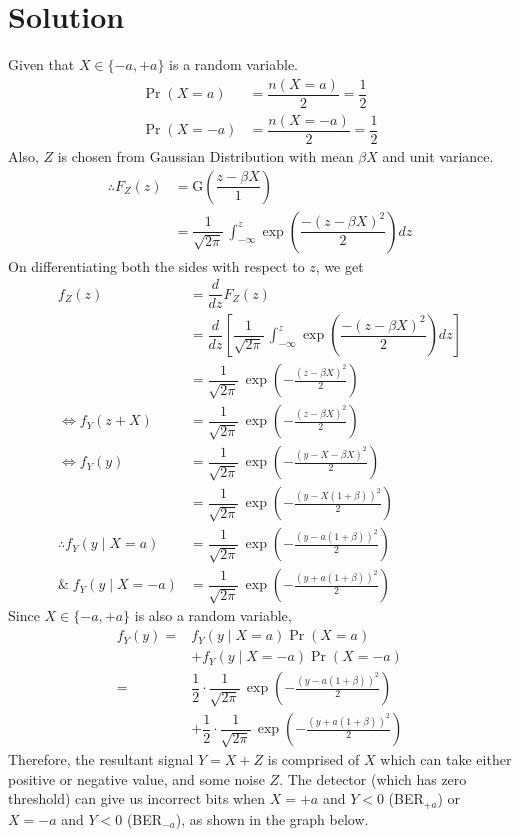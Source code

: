 \documentclass[journal,10pt,twocolumn]{IEEEtran}
\begin{document}
\section{Solution}
Given that $X \in \{ -a, +a\}$ is a random variable.
\begin{align}
\Pr(X=a) &= \dfrac{n(X=a)}{2} = \dfrac{1}{2}\\
\Pr(X=-a) &= \dfrac{n(X=-a)}{2} = \dfrac{1}{2}
\end{align}
Also, $Z$ is chosen from Gaussian Distribution with mean $\beta X$ and unit variance.
\begin{align}
\therefore F_Z(z) &= \text{G} \left( \dfrac{z - \beta X}{1} \right)\\
&= \dfrac{1}{\sqrt{2\pi}}\, \int_{-\infty} ^z \exp \left( \dfrac{-(z-\beta X)^2}{2} \right) dz
\end{align}
On differentiating both the sides with respect to $z$, we get
\begin{align}
f_Z(z) &= \dfrac{d}{dz}F_Z(z) \\
&= \dfrac{d}{dz} \left[ \dfrac{1}{\sqrt{2\pi}}\, \int_{-\infty} ^z \exp \left( \dfrac{-(z-\beta X)^2}{2} \right) dz \right] \\
 &= \dfrac{1}{\sqrt{2\pi}}\,\exp \left(-\frac{(z - \beta X)^2}{2} \right)  \\
\Leftrightarrow f_Y(z + X) &= \dfrac{1}{\sqrt{2\pi}}\,\exp \left(-\frac{(z - \beta X)^2}{2} \right)  \\
\Leftrightarrow f_Y(y) &= \dfrac{1}{\sqrt{2\pi}}\,\exp \left(-\frac{(y - X - \beta X)^2}{2} \right)  \\
&= \dfrac{1}{\sqrt{2\pi}}\,\exp \left(-\frac{(y - X(1 + \beta))^2}{2} \right) \\
\therefore f_Y(y \;|\; X = a) &= \dfrac{1}{\sqrt{2\pi}}\,\exp \left(-\frac{(y - a(1 + \beta))^2}{2} \right) \label{eqn 2.0.9} \\
\& \; f_Y(y \;|\; X = -a) &= \dfrac{1}{\sqrt{2\pi}}\,\exp \left(-\frac{(y + a(1 + \beta))^2}{2} \right) \label{eqn 2.0.10}
\end{align}
Since $X \in \{ -a, +a\}$ is also a random variable,
\begin{align}
f_Y(y) = &f_Y(y\;|\;X = a)\Pr(X=a) \nonumber \\
               &+ f_Y(y\;|\;X = -a)\Pr(X=-a)\\
 = &\dfrac{1}{2} \cdot \dfrac{1}{\sqrt{2\pi}}\,\exp \left(-\frac{(y - a(1 + \beta))^2}{2} \right) \nonumber \\
      &+ \dfrac{1}{2} \cdot \dfrac{1}{\sqrt{2\pi}}\,\exp \left(-\frac{(y + a(1 + \beta))^2}{2} \right)
\end{align}
Therefore, the resultant signal $Y = X+Z$ is comprised of $X$ which can take either positive or negative value, and some noise $Z$. The detector (which has zero threshold) can give us incorrect bits when $X = +a$ and $Y<0$ (BER$_{+a}$) or $X=-a$ and $Y<0$ (BER$_{-a}$), as shown in the graph below.
\end{document}
